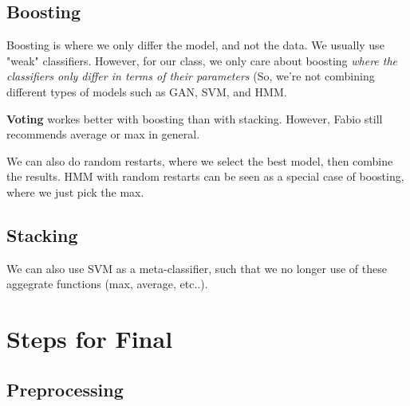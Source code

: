 \documentclass[12pt]{article}
\begin{document}
\subsection{Boosting}
Boosting is where we only differ the model, and not the data. We usually use "weak" classifiers. However, for our class, we only care about boosting \textit{where the classifiers only differ in terms of their parameters} (So, we're not combining different types of models such as GAN, SVM, and HMM.

\textbf{Voting} workes better with boosting than with stacking. However, Fabio still recommends average or max in general. 

We can also do random restarts, where we select the best model, then combine the  results. HMM with random restarts can be seen as a special case of boosting, where we just pick the max.
\subsection{Stacking}

We can also use SVM as a meta-classifier, such that we no longer use of these aggegrate functions (max, average, etc..).



\section{Steps for Final}

\subsection{Preprocessing}
\end{document}
